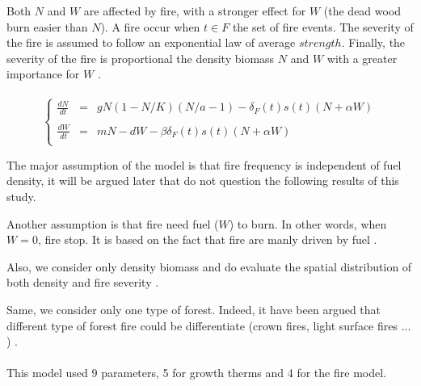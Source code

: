 \documentclass{article}
\begin{document}
Both $N$ and $W$ are affected by fire, with a stronger effect for $W$ (the dead wood burn easier than $N$). A fire occur when $t\in F$ the set of fire events. The severity of the fire is assumed to follow an exponential law of average $strength$. Finally, the severity of the fire is proportional the density biomass $N$ and $W$ with a greater importance for $W$ \cite{martinson_fuel_2013} \cite{safford_effects_2009} \cite{lecomte_effects_2006}.

\paragraph{}

\[
\left\lbrace
\begin{array}{rcl}
\frac{dN}{dt} & = & gN(1-N/K)(N/a-1) - \delta_F(t)s(t)(N+\alpha W) \\
\\
\frac{dW}{dt} & = & mN -dW - \beta\delta_F(t)s(t)(N+\alpha W) \\
\end{array}
\right.
\]

The major assumption of the model is that fire frequency is independent of fuel density, it will be argued later that do not question the following results of this study.

Another assumption is that fire need fuel ($W$) to burn. In other words, when $W=0$, fire stop. It is based on the fact that fire are manly driven by fuel \cite{schoennagel_interaction_2004} \cite{stephens_effects_2012} \cite{syphard_comparing_2011} \cite{safford_effects_2009} \cite{stephens_experimental_2005}.

Also, we consider only density biomass and do evaluate the spatial distribution of both density and fire severity \cite{bergeron_natural_2002}.

Same, we consider only one type of forest. Indeed, it have been argued that different type of forest fire could be differentiate (crown fires, light surface fires ... ) \cite{heinselman1981fire}.


\paragraph{}

This model used $9$ parameters, 5 for growth therms and 4 for the fire model.
\end{document}
